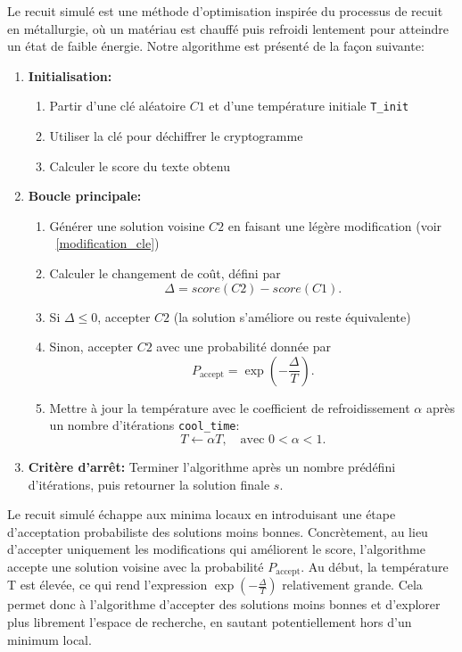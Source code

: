 \documentclass[a4paper]{article}
\begin{document}
Le recuit simulé est une méthode d’optimisation inspirée du processus de recuit en métallurgie, où un matériau est chauffé puis refroidi lentement pour atteindre un état de faible énergie.
Notre algorithme est présenté de la façon suivante:
\begin{enumerate}
    \item \textbf{Initialisation:} 
    \begin{enumerate}
        \item Partir d'une clé aléatoire $C1$ et d'une température initiale \texttt{T\_init}
        \item Utiliser la clé pour déchiffrer le cryptogramme
        \item Calculer le score du texte obtenu
    \end{enumerate}
    \item \textbf{Boucle principale:}
    \begin{enumerate}[label= (\alph*)]
        \item Générer une solution voisine $C2$ en faisant une légère modification (voir ~\ref{modification_cle})
        \item Calculer le changement de coût, défini par
        \[
            \Delta = score(C2) - score(C1).
        \]
        \item Si $\Delta \leq 0$, accepter $C2$ (la solution s'améliore ou reste équivalente)
        \item Sinon, accepter $C2$ avec une probabilité donnée par
        \[
            P_{\text{accept}} = \exp\left(-\frac{\Delta}{T}\right).
        \]
        \item Mettre à jour la température avec le coefficient de refroidissement $\alpha$ après un nombre d'itérations \texttt{cool\_time}:
        \[
            T \leftarrow \alpha T, \quad \text{avec } 0 < \alpha < 1.
        \]
    \end{enumerate}
    
    \item \textbf{Critère d'arrêt:} Terminer l'algorithme après un nombre prédéfini d'itérations, puis retourner la solution finale $s$.
\end{enumerate}

Le recuit simulé échappe aux minima locaux en introduisant une étape d'acceptation probabiliste des solutions moins bonnes. Concrètement, au lieu d'accepter uniquement les modifications qui améliorent le score, l'algorithme accepte une solution voisine avec la probabilité $P_{\text{accept}}$.
Au début, la température T est élevée, ce qui rend l'expression $\exp\left(-\frac{\Delta}{T}\right)$ relativement grande. Cela permet donc à l'algorithme d'accepter des solutions moins bonnes et d'explorer plus librement l'espace de recherche, en sautant potentiellement hors d'un minimum local.
\end{document}
